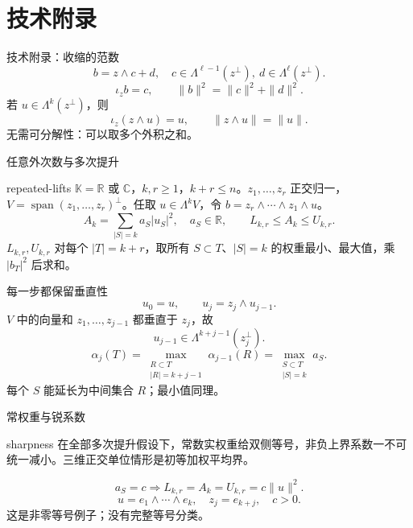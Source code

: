 \documentclass{beamer}
\begin{document}
\section{技术附录}
\begin{frame}{技术附录：收缩的范数}
\[
b=z\wedge c+d,
\quad c\in\Lambda^{\ell-1}(z^\perp),\ d\in\Lambda^\ell(z^\perp).
\]
\[
\iota_zb=c,\qquad\|b\|^2=\|c\|^2+\|d\|^2.
\]
若 $u\in\Lambda^k(z^\perp)$，则
\[
\iota_z(z\wedge u)=u,\qquad\|z\wedge u\|=\|u\|.
\]
无需可分解性：可以取多个外积之和。
\end{frame}
\begin{frame}{任意外次数与多次提升}
\small
\begin{bookresult}{repeated-lifts}
$\mathbb K=\mathbb R$ 或 $\mathbb C$，$k,r\ge1$，$k+r\le n$。$z_1,\ldots,z_r$ 正交归一，$V=\operatorname{span}(z_1,\ldots,z_r)^\perp$。任取 $u\in\Lambda^kV$，令 $b=z_r\wedge\cdots\wedge z_1\wedge u$。
\[
A_k=\sum_{|S|=k}a_S|u_S|^2,\quad a_S\in\mathbb R,
\qquad L_{k,r}\le A_k\le U_{k,r}.
\]
$L_{k,r},U_{k,r}$ 对每个 $|T|=k+r$，取所有 $S\subset T$、$|S|=k$ 的权重最小、最大值，乘 $|b_T|^2$ 后求和。
\end{bookresult}
\end{frame}
\begin{frame}{每一步都保留垂直性}
\[
u_0=u,\qquad u_j=z_j\wedge u_{j-1}.
\]
$V$ 中的向量和 $z_1,\ldots,z_{j-1}$ 都垂直于 $z_j$，故
\[
u_{j-1}\in\Lambda^{k+j-1}(z_j^\perp).
\]
\[
\alpha_j(T)=\max_{\substack{R\subset T\\|R|=k+j-1}}\alpha_{j-1}(R)
=\max_{\substack{S\subset T\\|S|=k}}a_S.
\]
每个 $S$ 能延长为中间集合 $R$；最小值同理。
\end{frame}
\begin{frame}{常权重与锐系数}
\begin{bookresult}{sharpness}
在全部多次提升假设下，常数实权重给双侧等号，非负上界系数一不可统一减小。三维正交单位情形是初等加权平均界。
\end{bookresult}
\[
a_S=c\Longrightarrow L_{k,r}=A_k=U_{k,r}=c\|u\|^2.
\]
\[
u=e_1\wedge\cdots\wedge e_k,\quad z_j=e_{k+j},\quad c>0.
\]
\small 这是非零等号例子；没有完整等号分类。
\end{frame}
\end{document}
